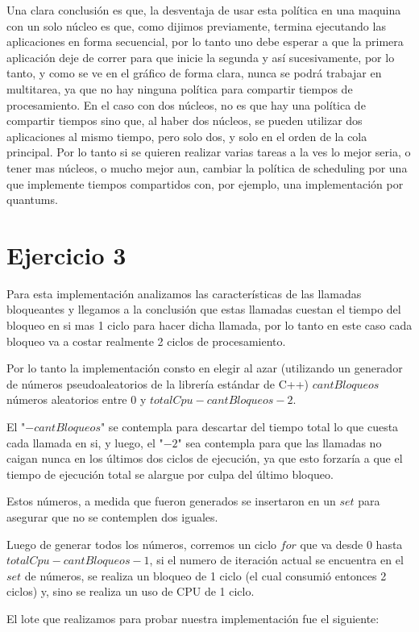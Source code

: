 \documentclass{article}
\begin{document}
Una clara conclusión es que, la desventaja de usar esta política en una maquina con un solo núcleo es que, como dijimos previamente, termina ejecutando las aplicaciones en forma secuencial, por lo tanto uno debe esperar a que la primera aplicación deje de correr para que inicie la segunda y así sucesivamente, por lo tanto, y como se ve en el gráfico de forma clara, nunca se podrá trabajar en multitarea, ya que no hay ninguna política para compartir tiempos de procesamiento. En el caso con dos núcleos, no es que hay una política de compartir tiempos sino que, al haber dos núcleos, se pueden utilizar dos aplicaciones al mismo tiempo, pero solo dos, y solo en el orden de la cola principal. Por lo tanto si se quieren realizar varias tareas a la ves lo mejor seria, o tener mas núcleos, o mucho mejor aun, cambiar la política de scheduling por una que implemente tiempos compartidos con, por ejemplo, una implementación por quantums.

\section{Ejercicio 3}

Para esta implementación analizamos las características de las llamadas bloqueantes y llegamos a la conclusión que estas llamadas cuestan el tiempo del bloqueo en si mas 1 ciclo para hacer dicha llamada, por lo tanto en este caso cada bloqueo va a costar realmente 2 ciclos de procesamiento.\par
Por lo tanto la implementación consto en elegir al azar (utilizando un generador de números pseudoaleatorios de la librería estándar de C++) $cantBloqueos$ números aleatorios entre $0$ y $totalCpu - cantBloqueos - 2$.\par
El "$-cantBloqueos$" se contempla para descartar del tiempo total lo que cuesta cada llamada en si, y luego, el "$-2$" sea contempla para que las llamadas no caigan nunca en los últimos dos ciclos de ejecución, ya que esto forzaría a que el tiempo de ejecución total se alargue por culpa del último bloqueo.\par
Estos números, a medida que fueron generados se insertaron en un $set$ para asegurar que no se contemplen dos iguales.\par
Luego de generar todos los números, corremos un ciclo $for$ que va desde $0$ hasta $totalCpu - cantBloqueos - 1$, si el numero de iteración actual se encuentra en el $set$ de números, se realiza un bloqueo de 1 ciclo (el cual consumió entonces 2 ciclos) y, sino se realiza un uso de CPU de 1 ciclo.\par
El lote que realizamos para probar nuestra implementación fue el siguiente:
\end{document}
